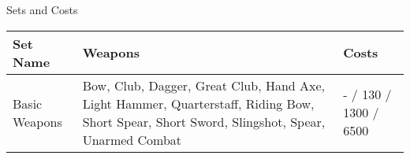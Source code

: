 Sets and Costs\\
\begin{longtable}{p{3cm} | p{5cm} | p{2.5cm} }
	Set Name & Weapons & Costs\\\hline
	Basic Weapons & Bow, Club, Dagger, Great Club, Hand Axe, Light Hammer, Quarterstaff, Riding Bow, Short Spear, Short Sword, Slingshot, Spear, Unarmed Combat & - / 130 / 1300 / 6500\\
\end{longtable}